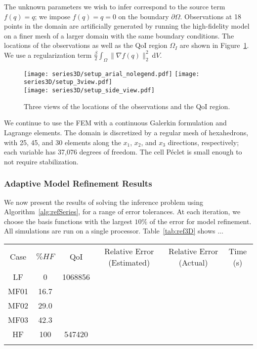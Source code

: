 The unknown parameters we wish to infer correspond to the source term $f(q)=q$; we impose $f(q)=q=0$ on the boundary $\partial\Omega$. Observations at 18 points in the domain are artificially generated by running the high-fidelity model on a finer mesh of a larger domain with the same boundary conditions. The locations of the observations as well as the QoI region $\Omega_I$ are shown in Figure~\ref{fig:setup3D}. We use a regularization term $\frac{\beta}{2}\int_\Omega \|\nabla f(q)\|_2^2\:\textrm{d}V$.
%
\begin{figure}[h]
\centering
\texttt{[image: series3D/setup\_arial\_nolegend.pdf]} \hfill
\texttt{[image: series3D/setup\_3view.pdf]} \\ 
\vspace{\baselineskip}
\texttt{[image: series3D/setup\_side\_view.pdf]}
\caption{Three views of the locations of the observations and the QoI region.}
\label{fig:setup3D}
\end{figure}
%
We continue to use the FEM with a continuous Galerkin formulation and Lagrange elements. The domain is discretized by a regular mesh of hexahedrons, with 25, 45, and 30 elements along the $x_1$, $x_2$, and $x_3$ directions, respectively; each variable has 37,076 degrees of freedom. The cell P\'{e}clet is small enough to not require stabilization.

\subsubsection{Adaptive Model Refinement Results} \label{sec:ref3D}

We now present the results of solving the inference problem using Algorithm~\ref{alg:refSeries}, for a range of error tolerances. At each iteration, we choose the basis functions with the largest $10\%$ of the error for model refinement. All simulations are run on a single processor. Table~\ref{tab:ref3D} shows ...
%
\begin{tabular}{c|c|c|c|c|c}
Case & $\%HF$ & QoI & Relative Error (Estimated) & Relative Error (Actual) & Time (s) \\
LF & 0 & 1068856 &  &  &  \\
MF01 & 16.7 &  &  &  &  \\
MF02 & 29.0 &  &  &  &  \\
MF03 & 42.3 &  &  &  &  \\
HF & 100 & 547420 &  &  &  \\
\caption{...}
\end{tabular}

